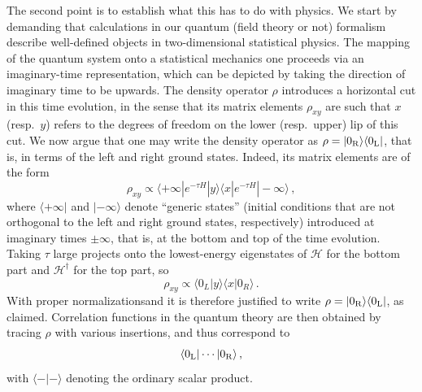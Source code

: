\documentclass[a4paper,10pt]{article}
\newcommand{\jesper}[1]{$\framebox{\tiny J}$\ \textbf{\texttt{{\color{cyan}\footnotesize#1}}}}
\begin{document}
The second point is to establish what this has to do with physics. We start by demanding that calculations in our quantum (field theory or not) formalism describe well-defined objects in two-dimensional statistical physics. The mapping of the quantum system onto a statistical mechanics one proceeds via an imaginary-time representation, which can be depicted by taking the direction of imaginary time to be upwards. The density operator $\rho$ introduces a horizontal cut in
this time evolution, in the sense that its matrix elements $\rho_{xy}$ are such that $x$ (resp.\ $y$) refers to the degrees of freedom on the lower (resp.\ upper)
lip of this cut. We now argue that one may write the density operator as $\rho=|0_{\rm R}\rangle\langle 0_{\rm L}|$, that is, in terms of the left and right ground states.
Indeed, its matrix elements are of the form
%
$$
\rho_{xy}\propto\langle +\infty|e^{-\tau H}|y\rangle\langle x|e^{-\tau H}|-\infty\rangle \,,
$$
%
where $\langle +\infty |$ and $|-\infty\rangle$ denote ``generic states'' (initial conditions that are not orthogonal to the left and right ground states, respectively) introduced at imaginary times $\pm \infty$, that is, at the bottom and top of the time evolution.
Taking $\tau$ large projects onto the lowest-energy eigenstates of ${\mathcal H}$ for the bottom part and ${\mathcal H}^\dagger$ for the top part, so
%
$$
\rho_{xy}\propto \langle 0_L|y\rangle \langle x|0_R\rangle \,.
$$
With proper normalizationsand it is therefore justified to write $\rho=|0_{\rm R}\rangle\langle 0_{\rm L}|$, as claimed. Correlation functions in the quantum theory are then obtained by tracing $\rho$ with various insertions, and thus correspond to 
%
\begin{equation}
\langle 0_{\rm L}|\cdots|0_{\rm R}\rangle \,,
\end{equation}
%
with $\langle - | - \rangle$ denoting the ordinary scalar product. 


%
%

\medskip
\end{document}
